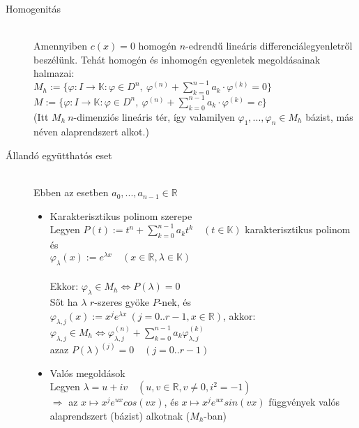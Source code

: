 \documentclass[margin=0px]{article}
\newcommand{\R}{\mathbb{R}}
\begin{document}
\begin{description}
    \item[Homogenitás] \hfill \\
        Amennyiben $c(x) = 0$ homogén $n$-edrendű lineáris differenciálegyenletről beszélünk. Tehát homogén és inhomogén egyenletek megoldásainak halmazai: \\
        $ M_h := \{\varphi : I \rightarrow \mathbb{K} : \varphi \in D^n, \ \varphi^{(n)} + \sum\limits_{k=0}^{n-1}a_k\cdot\varphi^{(k)} = 0 \} $ \\
        $ M := \{\varphi : I \rightarrow \mathbb{K} : \varphi \in D^n, \ \varphi^{(n)} + \sum\limits_{k=0}^{n-1}a_k\cdot\varphi^{(k)} = c \} $ \\
        (Itt $M_h \ n$-dimenziós lineáris tér, így valamilyen $ \varphi_1,...,\varphi_n \in M_h$ bázist, más néven alaprendszert alkot.)
    \item[Állandó együtthatós eset] \hfill \\
        Ebben az esetben $a_0,...,a_{n-1} \in \R$
        \begin{itemize}
            \item Karakterisztikus polinom szerepe \\
                  Legyen $P(t) := t^n + \sum\limits_{k=0}^{n-1}a_kt^k \quad (t \in \mathbb{K})$ karakterisztikus polinom és \\
                  $ \varphi_\lambda(x) := e^{\lambda x} \quad (x \in \R, \lambda \in \mathbb{K}) $ \\\\
                  Ekkor: $ \varphi_\lambda \in M_h \Longleftrightarrow P(\lambda) = 0 $\\
                  Sőt ha $ \lambda $ $r$-szeres gyöke $P$-nek, és \\
                  $ \varphi_{\lambda,j}(x) := x^je^{\lambda x} \ (j = 0..r-1, x\in\R)$, akkor:
                  $ \varphi_{\lambda,j} \in M_h \Longleftrightarrow \varphi_{\lambda, j}^{(n)}+\sum\limits_{k=0}^{n-1}a_k\varphi_{\lambda, j}^{(k)} $ \\
                  azaz $P(\lambda)^{(j)} = 0 \quad (j = 0..r-1)$
            \item Valós megoldások \\
                  Legyen $ \lambda = u+iv \quad (u,v \in \R, v\neq0, i^2 = -1) $ \\
                  $ \Rightarrow $ az $ x \mapsto x^je^{ux}cos(vx)$, és $x \mapsto x^je^{ux}sin(vx)$ függvények valós alaprendszert (bázist) alkotnak ($M_h$-ban)
        \end{itemize}

\end{description}
\end{document}
